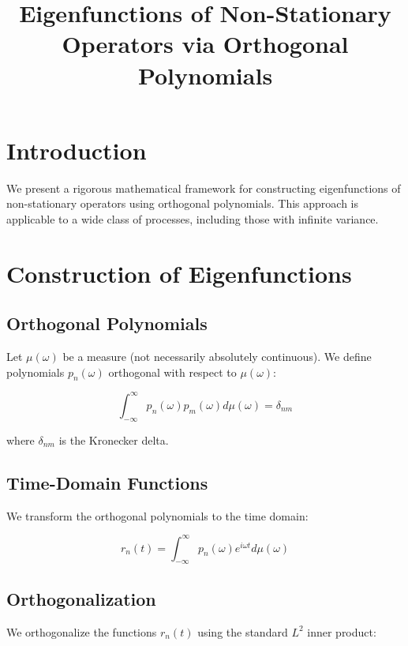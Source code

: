 \documentclass{article}
\title{Eigenfunctions of Non-Stationary Operators via Orthogonal Polynomials}
\author{}
\date{}
\begin{document}
\maketitle

\section{Introduction}

We present a rigorous mathematical framework for constructing eigenfunctions of non-stationary operators using orthogonal polynomials. This approach is applicable to a wide class of processes, including those with infinite variance.

\section{Construction of Eigenfunctions}

\subsection{Orthogonal Polynomials}

Let $\mu(\omega)$ be a measure (not necessarily absolutely continuous). We define polynomials $p_n(\omega)$ orthogonal with respect to $\mu(\omega)$:

\begin{equation}
\int_{-\infty}^{\infty} p_n(\omega) p_m(\omega) d\mu(\omega) = \delta_{nm}
\end{equation}

where $\delta_{nm}$ is the Kronecker delta.

\subsection{Time-Domain Functions}

We transform the orthogonal polynomials to the time domain:

\begin{equation}
r_n(t) = \int_{-\infty}^{\infty} p_n(\omega) e^{i\omega t} d\mu(\omega)
\end{equation}

\subsection{Orthogonalization}

We orthogonalize the functions $r_n(t)$ using the standard $L^2$ inner product:
\end{document}
